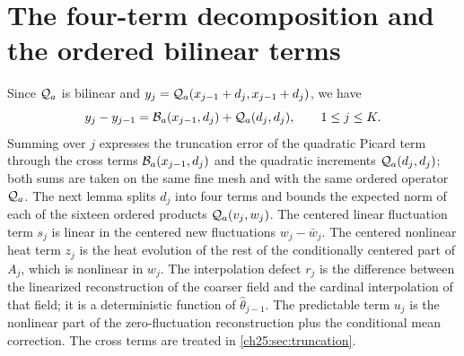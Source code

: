 \section{The four-term decomposition and the ordered bilinear terms}\label{ch25:sec:ordered}

Since $\mathcal Q_{a}$ is bilinear and $y_j=\mathcal Q_{a}(x_{j-1}+d_j,x_{j-1}+d_j)$, we have
\begin{equation}\label{ch25:eq:quadratic-increment}
 y_j-y_{j-1}=\mathcal B_{a}(x_{j-1},d_j)+\mathcal Q_{a}(d_j,d_j),\qquad 1\le j\le K.
\end{equation}
Summing over $j$ expresses the truncation error of the quadratic Picard term through the cross terms $\mathcal B_{a}(x_{j-1},d_j)$ and the quadratic increments $\mathcal Q_{a}(d_j,d_j)$; both sums are taken on the same fine mesh and with the same ordered operator $\mathcal Q_{a}$. The next lemma splits $d_j$ into four terms and bounds the expected norm of each of the sixteen ordered products $\mathcal Q_{a}(v_j,w_j)$. The centered linear fluctuation term $s_j$ is linear in the centered new fluctuations $w_j-\bar w_j$. The centered nonlinear heat term $z_j$ is the heat evolution of the rest of the conditionally centered part of $A_j$, which is nonlinear in $w_j$. The interpolation defect $r_j$ is the difference between the linearized reconstruction of the coarser field and the cardinal interpolation of that field; it is a deterministic function of $\widehat\theta_{j-1}$. The predictable term $u_j$ is the nonlinear part of the zero-fluctuation reconstruction plus the conditional mean correction. The cross terms are treated in \cref{ch25:sec:truncation}.

